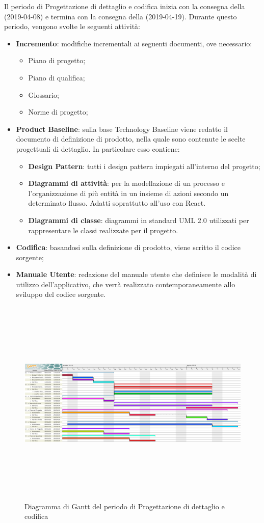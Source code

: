 Il periodo di Progettazione di dettaglio e codifica inizia con la consegna della \RP{} (2019-04-08) e termina con la consegna della \RQ{} (2019-04-19).\newline
Durante questo periodo, vengono svolte le seguenti attività:
\begin{itemize}
	\item \textbf{Incremento}: modifiche incrementali ai seguenti documenti, ove necessario:
	\begin{itemize}
		\item Piano di progetto;
		\item Piano di qualifica;
		\item Glossario;
		\item Norme di progetto;
	\end{itemize}
	\item \textbf{Product Baseline}: sulla base Technology Baseline viene redatto il documento di definizione di prodotto, nella quale sono contenute le scelte progettuali di dettaglio. In particolare esso contiene:
	\begin{itemize}
		\item {\textbf{Design Pattern}}: tutti i design pattern impiegati all'interno del progetto;
		\item \textbf{Diagrammi di attività}: per la modellazione di un processo e l'organizzazione di più entità in un insieme di azioni secondo un determinato flusso. Adatti soprattutto all'uso con {React}.
		\item  \textbf{Diagrammi di classe}: diagrammi in standard UML 2.0 utilizzati per rappresentare le classi realizzate per il progetto.
	\end{itemize}
	\item \textbf{Codifica}: basandosi sulla definizione di prodotto, viene scritto il codice sorgente;
	\item \textbf{Manuale Utente}: redazione del manuale utente che definisce le modalità di utilizzo dell'applicativo, che verrà realizzato contemporaneamente allo sviluppo del codice sorgente. 
\end{itemize}
\begin{figure}[H]
	\centering
	\hspace*{-1.5cm}
	\includegraphics[width=19.4cm, height=10cm]{Pianificazione/progettazioneDettaglioCodifica.pdf}
	\caption{Diagramma di Gantt del periodo di Progettazione di dettaglio e codifica}
\end{figure}
